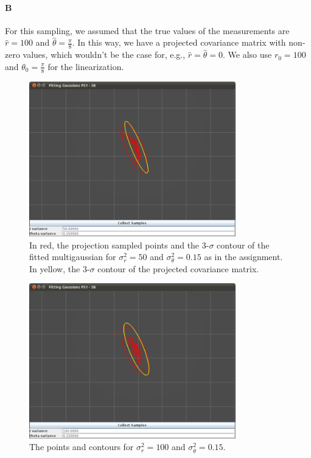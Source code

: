\documentclass[12pt]{article}
\begin{document}
\paragraph{B} For this sampling, we assumed that the true values of the measurements are $\hat{r}=100$ and $\hat{\theta}=\frac{\pi}{8}$. In this way, we have a projected covariance matrix with non-zero values, which wouldn't be the case for, e.g., $\hat{r}=\hat{\theta}=0$. We also use $r_0=100$ and $\theta_0=\frac{\pi}{8}$ for the linearization.

\begin{figure}
\centering
\includegraphics[width=0.8\textwidth]{figures/GaussianFit_50_0_15.png}
\caption{In red, the projection sampled points and the 3-$\sigma$ contour of the fitted multigaussian for $\sigma^2_r=50$ and $\sigma^2_\theta=0.15$ as in the assignment. In yellow, the 3-$\sigma$ contour of the projected covariance matrix.}
\label{fig:covplot_50_15}
\end{figure}

\begin{figure}
\centering
\includegraphics[width=0.8\textwidth]{figures/GaussianFit_100_0_15.png}
\caption{The points and contours for $\sigma^2_r=100$ and $\sigma^2_\theta=0.15$.}
\label{fig:covplot_100_15}
\end{figure}
\end{document}
